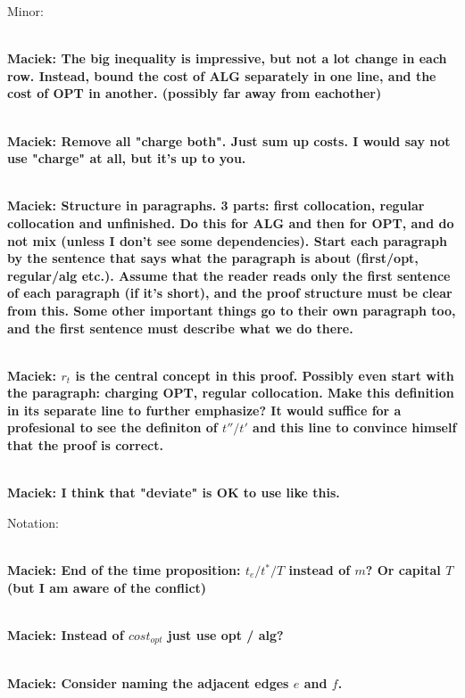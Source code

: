 \documentclass[manuscript,screen=true, review, anonymous]{acmart}
\newcommand\maciek[1]{\color{brown}\textbf{\\ Maciek: #1}\color{black}}
\begin{document}
Minor:

\maciek{The big inequality is impressive, but not a lot change in each row. Instead, bound the cost of ALG separately in one line, and the cost of OPT in another. (possibly far away from eachother)}

\maciek{Remove all "charge both". Just sum up costs. I would say not use "charge" at all, but it's up to you.}


\maciek{Structure in paragraphs. 3 parts: first collocation, regular collocation and unfinished. Do this for ALG and then for OPT, and do not mix (unless I don't see some dependencies). Start each paragraph by the sentence that says what the paragraph is about (first/opt, regular/alg etc.). Assume that the reader reads only the first sentence of each paragraph (if it's short), and the proof structure must be clear from this. Some other important things go to their own paragraph too, and the first sentence must describe what we do there.}

\maciek{$r_t$ is the central concept in this proof. Possibly even start with the paragraph: charging OPT, regular collocation. Make this definition in its separate line to further emphasize? It would suffice for a profesional to see the definiton of $t''/t'$ and this line to convince himself that the proof is correct.}

\maciek{I think that "deviate" is OK to use like this.}

Notation:

\maciek{End of the time proposition: $t_e / t^* / T$ instead of $m$? Or capital $T$ (but I am aware of the conflict)}

\maciek{Instead of $cost_{opt}$ just use opt / alg?}

\maciek{Consider naming the adjacent edges $e$ and $f$.}
\end{document}

